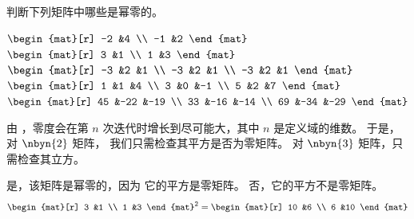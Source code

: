 \begin{exercises}
  \item
    判断下列矩阵中哪些是幂零的。
    \begin{exparts*}
      \partsitem
        $\begin{mat}[r]
           -2  &4  \\
           -1  &2
         \end{mat}$
       \partsitem
         $\begin{mat}[r]
           3  &1  \\
           1  &3
         \end{mat}$
       \partsitem
         $\begin{mat}[r]
           -3  &2  &1  \\
           -3  &2  &1  \\
           -3  &2  &1
         \end{mat}$
       \partsitem
         $\begin{mat}[r]
            1  &1  &4  \\
            3  &0  &-1 \\
            5  &2  &7
         \end{mat}$
       \partsitem
         $\begin{mat}[r]
            45  &-22  &-19  \\
            33  &-16  &-14  \\
            69  &-34  &-29
         \end{mat}$
     \end{exparts*}
     \begin{answer}
       由 ，零度会在第 $n$ 次迭代时增长到尽可能大，其中 $n$ 是定义域的维数。
       于是，对 $\nbyn{2}$ 矩阵，
       我们只需检查其平方是否为零矩阵。
       对 $\nbyn{3}$ 矩阵，只需检查其立方。
       \begin{exparts}
         \partsitem 是，该矩阵是幂零的，因为
           它的平方是零矩阵。
         \partsitem 否，它的平方不是零矩阵。
           \begin{equation*}
             \begin{mat}[r]
                3  &1  \\
                1  &3
             \end{mat}^2
             =\begin{mat}[r]
                10  &6  \\
                6   &10
             \end{mat}
           \end{equation*}

\end{exparts}
\end{answer}
\end{exercises}
